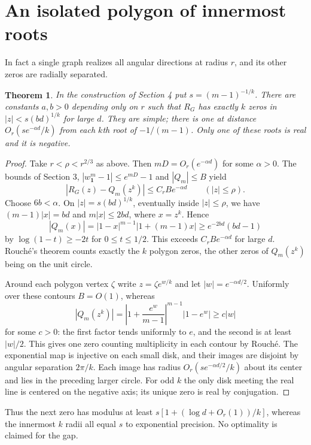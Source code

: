 \documentclass[11pt]{article}
\newtheorem{theorem}{Theorem}
\newcommand{\one}{\boldsymbol{1}}
\begin{document}
\section{An isolated polygon of innermost roots}
In fact a single graph realizes all angular directions at radius $r$, and its other zeros are radially separated.
\begin{theorem}
In the construction of Section 4 put $s=(m-1)^{-1/k}$. There are constants $a,b>0$ depending only on $r$ such that $R_G$ has exactly $k$ zeros in $|z|<s(bd)^{1/k}$ for large $d$. They are simple; there is one at distance $O_r(se^{-ad}/k)$ from each $k$th root of $-1/(m-1)$. Only one of these roots is real and it is negative.
\end{theorem}
\begin{proof}
Take $r<\rho<r^{2/3}$ as above. Then $mD=O_r(e^{-\alpha d})$ for some $\alpha>0$. The bounds of Section 3, $|w_{\one}^m-1|\le e^{mD}-1$ and $|Q_m|\le B$ yield
\[
 |R_G(z)-Q_m(z^k)|\le C_r B e^{-\alpha d}\qquad (|z|\le\rho).
\]
Choose $6b<\alpha$. On $|z|=s(bd)^{1/k}$, eventually inside $|z|\le\rho$, we have $(m-1)|x|=bd$ and $m|x|\le2bd$, where $x=z^k$. Hence
\[
 |Q_m(x)|=|1-x|^{m-1}|1+(m-1)x|\ge e^{-2bd}(bd-1)
\]
by $\log(1-t)\ge-2t$ for $0\le t\le1/2$. This exceeds $C_rBe^{-\alpha d}$ for large $d$. Rouch\'e's theorem counts exactly the $k$ polygon zeros, the other zeros of $Q_m(z^k)$ being on the unit circle.

Around each polygon vertex $\zeta$ write $z=\zeta e^{w/k}$ and let $|w|=e^{-\alpha d/2}$. Uniformly over these contours $B=O(1)$, whereas
\[
 |Q_m(z^k)|=\left|1+\frac{e^w}{m-1}\right|^{m-1}|1-e^w|
 \ge c|w|
\]
for some $c>0$: the first factor tends uniformly to $e$, and the second is at least $|w|/2$. This gives one zero counting multiplicity in each contour by Rouch\'e. The exponential map is injective on each small disk, and their images are disjoint by angular separation $2\pi/k$. Each image has radius $O_r(se^{-\alpha d/2}/k)$ about its center and lies in the preceding larger circle. For odd $k$ the only disk meeting the real line is centered on the negative axis; its unique zero is real by conjugation.
\end{proof}
Thus the next zero has modulus at least $s[1+(\log d+O_r(1))/k]$, whereas the innermost $k$ radii all equal $s$ to exponential precision. No optimality is claimed for the gap.
\end{document}
